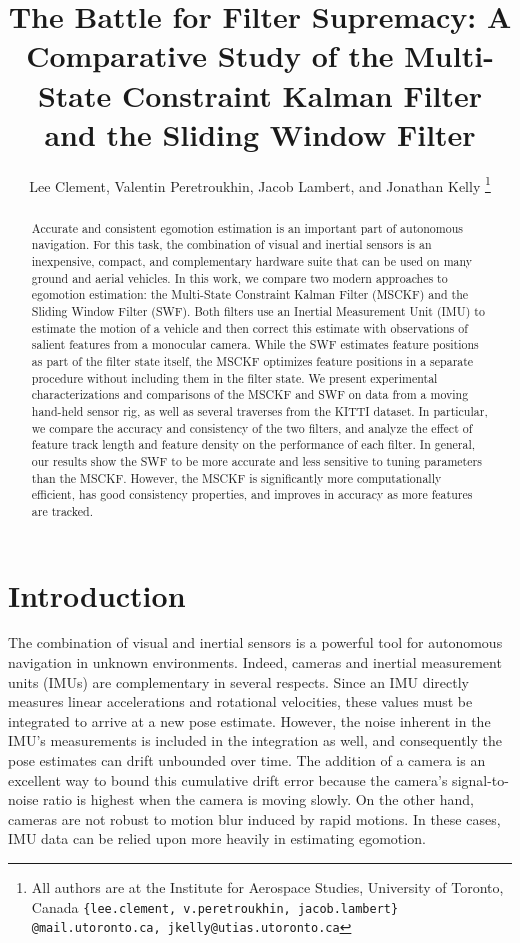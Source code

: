 \documentclass[letterpaper, 10 pt, conference]{ieeeconf}  %
\title{\LARGE \bf
The Battle for Filter Supremacy: A Comparative Study of the Multi-State Constraint Kalman Filter and the Sliding Window Filter
}
\author{Lee Clement, Valentin Peretroukhin, Jacob Lambert, and Jonathan Kelly%
\thanks{All authors are at the Institute for Aerospace Studies, University of Toronto, Canada
        {\tt \{lee.clement, v.peretroukhin, jacob.lambert\} @mail.utoronto.ca, jkelly@utias.utoronto.ca}
        }%
}
\begin{document}
\maketitle
\thispagestyle{empty}
\pagestyle{empty}


\begin{abstract}
Accurate and consistent egomotion estimation is an important part of autonomous navigation.
For this task, the combination of visual and inertial sensors is an inexpensive, compact, and complementary hardware suite that can be used on many ground and aerial vehicles.
In this work, we compare two modern approaches to egomotion estimation: the Multi-State Constraint Kalman Filter (MSCKF) and the Sliding Window Filter (SWF).
Both filters use an Inertial Measurement Unit (IMU) to estimate the motion of a vehicle and then correct this estimate with observations of salient features from a monocular camera.
While the SWF estimates feature positions as part of the filter state itself, the MSCKF optimizes feature positions in a separate procedure without including them in the filter state.
We present experimental characterizations and comparisons of the MSCKF and SWF on data from a moving hand-held sensor rig, as well as several traverses from the KITTI dataset.
In particular, we compare the accuracy and consistency of the two filters, and analyze the effect of feature track length and feature density on the performance of each filter.
In general, our results show the SWF to be more accurate and less sensitive to tuning parameters than the MSCKF.
However, the MSCKF is significantly more computationally efficient, has good consistency properties, and improves in accuracy as more features are tracked. 
\end{abstract}


\section{Introduction} \label{sec:introduction}

The combination of visual and inertial sensors is a powerful tool for autonomous navigation in unknown environments.
Indeed, cameras and inertial measurement units (IMUs) are complementary in several respects.
Since an IMU directly measures linear accelerations and rotational velocities, these values must be integrated to arrive at a new pose estimate.
However, the noise inherent in the IMU's measurements is included in the integration as well, and consequently the pose estimates can drift unbounded over time.
The addition of a camera is an excellent way to bound this cumulative drift error because the camera's signal-to-noise ratio is highest when the camera is moving slowly.
On the other hand, cameras are not robust to motion blur induced by rapid motions.
In these cases, IMU data can be relied upon more heavily in estimating egomotion.
\end{document}
